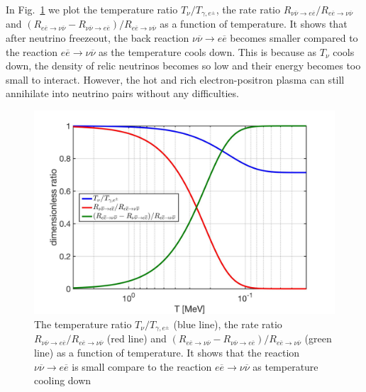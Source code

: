 In Fig.~\ref{DimensionlessRatio} we plot the temperature ratio $T_\nu/T_{\gamma,e^\pm}$, the rate ratio $R_{\nu\overline{\nu}\rightarrow e\overline{e}}/ R_{e\overline{e}\rightarrow\nu\overline{\nu}}$ and $(R_{e\overline{e}\rightarrow\nu\overline{\nu}}-R_{\nu\overline{\nu}\rightarrow e\overline{e}})/ R_{e\overline{e}\rightarrow\nu\overline{\nu}}$ as a function of temperature. It shows that after neutrino freezeout, the back reaction $\nu\overline{\nu}\rightarrow e\overline{e}$ becomes smaller compared to the reaction $e\overline{e}\rightarrow\nu\overline{\nu}$ as the temperature cools down. This is because as $T_\nu$ cools down, the density of relic neutrinos becomes so low and their energy becomes too small to interact. However, the hot and rich electron-positron plasma can still annihilate into neutrino pairs without any difficulties.
\begin{figure}[ht]
\begin{center}
\includegraphics[width=\textwidth]{./plots/DimensionlessRatio_ExtraNeutrino}
\caption{The temperature ratio $T_\nu/T_{\gamma,e^\pm}$ (blue line), the rate ratio $R_{\nu\overline{\nu}\rightarrow e\overline{e}}/ R_{e\overline{e}\rightarrow\nu\overline{\nu}}$ (red line) and $(R_{e\overline{e}\rightarrow\nu\overline{\nu}}-R_{\nu\overline{\nu}\rightarrow e\overline{e}})/ R_{e\overline{e}\rightarrow\nu\overline{\nu}}$ (green line) as a function of temperature. It shows that the reaction $\nu\overline{\nu}\rightarrow e\overline{e}$ is small compare to the reaction $e\overline{e}\rightarrow\nu\overline{\nu}$ as temperature cooling down}
\label{DimensionlessRatio}
\end{center}
\end{figure}

